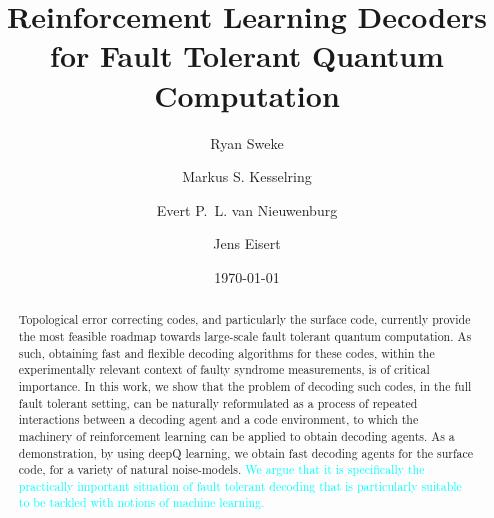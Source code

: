 \documentclass[twocolumn,preprintnumbers,amsmath,amssymb,notitlepage,nofootinbib,longbibliography,superscriptaddress,aps,pra,10pt]{revtex4-1}
\newcommand{\je}[1]{\textcolor{cyan}{#1}}
\begin{document}
\newtheorem{problem}{Problem}%

	\title{Reinforcement Learning Decoders for Fault Tolerant Quantum Computation}

	\author{Ryan Sweke}
	\author{Markus S. Kesselring}
	\author{Evert P.~L. van Nieuwenburg}
	\author{Jens Eisert}


	\date{\today}

	\begin{abstract}
		Topological error correcting codes, and particularly the surface code, currently provide the most feasible 
		roadmap towards large-scale fault tolerant quantum computation.
		As such, obtaining fast and flexible decoding algorithms for these codes, within the experimentally relevant context 
		of faulty syndrome measurements, is of critical importance.
		In this work, we show that the problem of decoding such codes, in the full fault tolerant setting, can be naturally reformulated as a process of 
		repeated interactions between a decoding agent and a code environment, to which the machinery of reinforcement learning 
		can be applied to obtain decoding agents.
		As a demonstration, by using deepQ learning, we obtain fast decoding agents for the surface code, for a variety of 
		natural noise-models.
		 \je{We argue that it is specifically the practically important situation of fault tolerant decoding that is particularly suitable
		 to be tackled with notions of machine learning.}
	\end{abstract}

\maketitle
\end{document}
